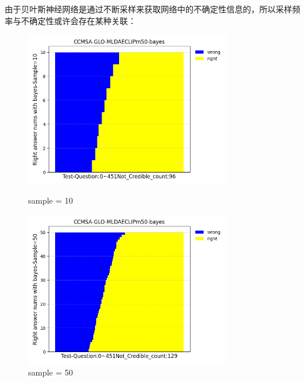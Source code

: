 由于贝叶斯神经网络是通过不断采样来获取网络中的不确定性信息的，所以采样频率与不确定性或许会存在某种关联：
\begin{figure}[htbp]
	\begin{minipage}{0.5\linewidth}
		\centering	
		\includegraphics[width=0.8\textwidth]{Fig/myfig/chapter4/sample10.png}  %
		\caption{\label{modal_bayes_medrad}sample = 10} 	
	\end{minipage}
	\begin{minipage}{0.5\linewidth}
		\centering	
		\includegraphics[width=0.8\textwidth]{Fig/myfig/chapter4/sample50.png}  %
		\caption{\label{modal_bayes_slake}sample = 50} 	
	\end{minipage}	
\end{figure}
